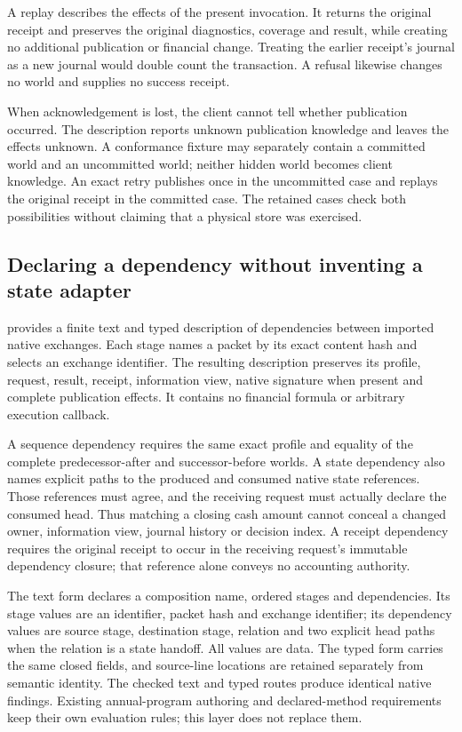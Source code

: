 A replay describes the effects of the present invocation. It returns the
original receipt and preserves the original diagnostics, coverage and result,
while creating no additional publication or financial change. Treating the
earlier receipt's journal as a new journal would double count the transaction.
A refusal likewise changes no world and supplies no success receipt.

When acknowledgement is lost, the client cannot tell whether publication
occurred. The description reports unknown publication knowledge and leaves the
effects unknown. A conformance fixture may separately contain a committed world
and an uncommitted world; neither hidden world becomes client knowledge. An exact
retry publishes once in the uncommitted case and replays the original receipt
in the committed case. The retained cases check both possibilities without
claiming that a physical store was exercised.

\subsection{Declaring a dependency without inventing a state adapter}

 provides a finite text and typed description
of dependencies between imported native exchanges. Each stage names a packet
by its exact content hash and selects an exchange identifier. The resulting
description preserves its profile, request, result, receipt, information view,
native signature when present and complete publication effects. It contains no
financial formula or arbitrary execution callback.

A sequence dependency requires the same exact profile and equality of the
complete predecessor-after and successor-before worlds. A state dependency also
names explicit paths to the produced and consumed native state references.
Those references must agree, and the receiving request must actually declare
the consumed head. Thus matching a closing cash amount cannot conceal a changed
owner, information view, journal history or decision index. A receipt dependency
requires the original receipt to occur in the receiving request's immutable
dependency closure; that reference alone conveys no accounting authority.

The text form declares a composition name, ordered stages and dependencies.
Its stage values are an identifier, packet hash and exchange identifier; its
dependency values are source stage, destination stage, relation and two explicit
head paths when the relation is a state handoff. All values are data. The typed
form carries the same closed fields, and source-line locations are retained
separately from semantic identity. The checked text and typed routes produce
identical native findings. Existing annual-program authoring and declared-method
requirements keep their own evaluation rules; this layer does not replace them.

